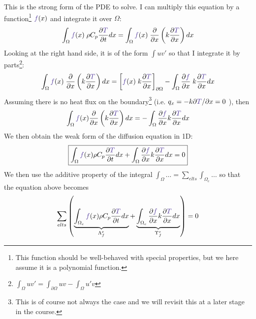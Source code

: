 This is the {\color{olive}strong form} of the PDE to solve. 
I can multiply this equation by a function\footnote{This function should be well-behaved with 
special properties, but we here assume it is a polynomial function.} ${\color{Violet}f}(x)$ 
and integrate it over $\Omega$:
\begin{equation}
\int_{\Omega} {\color{Violet}f}(x) \;  \rho C_p\frac{\partial {\color{Violet}T}}{\partial t} dx
=
\int_{\Omega} {\color{Violet}f}(x) \;  \frac{\partial }{\partial x} \left( k \frac{\partial {\color{Violet}T}}{\partial x}  \right) dx
\end{equation}
Looking at the right hand side, it is of the form $\int u v'$ so that I 
integrate it by parts\footnote{$\int_\Omega uv' = \int_{\partial\Omega} uv - \int_\Omega u'v$}:
\begin{equation}
\int_{\Omega} {\color{Violet}f}(x) \;  \frac{\partial }{\partial x} 
\left( k \frac{\partial {\color{Violet}T}}{\partial x}  \right) dx
=
\left[
 {\color{Violet}f}(x) \;  k \frac{\partial {\color{Violet}T}}{\partial x}
\right]_{\partial \Omega}
-
\int_{\Omega} \frac{\partial {\color{Violet}f}}{\partial x} \;   k \frac{\partial {\color{Violet}T}}{\partial x}  dx
\end{equation}
Assuming there is no heat flux on the boundary\footnote{This is of course not always the case
and we will revisit this at a later stage in the course.} (i.e. $q_x= - k \partial {\color{Violet}T}/\partial x = 0$ ), then
\begin{equation}
\int_{\Omega} {\color{Violet}f}(x) \frac{\partial }{\partial x} \left( k \frac{\partial {\color{Violet}T}}{\partial x}  
\right) dx
=
- \int_{\Omega} \frac{\partial {\color{Violet}f}}{\partial x}  k \frac{\partial {\color{Violet}T}}{\partial x}  dx
\end{equation}
We then obtain the {\color{olive}weak form} of the diffusion equation in 1D:
\begin{equation}
\boxed{
\int_{\Omega} {\color{Violet}f}(x) \rho C_p \frac{\partial {\color{Violet}T}}{\partial t} dx
+
\int_{\Omega} \frac{\partial {\color{Violet}f}}{\partial x}  k \frac{\partial {\color{Violet}T}}{\partial x}  dx = 0
}
\end{equation}
We then use the additive property of the integral 
$\int_\Omega \dots = \sum\limits_{elts} \int_{\Omega_e} \dots$
so that the equation above becomes 
\begin{equation}
\sum_{elts} \left(     
\underbrace{ \int_{\Omega_e} {\color{Violet}f}(x) \rho C_p   \frac{\partial {\color{Violet}T}}{\partial t} dx }_{{\Lambda}_f^e}
+
\underbrace{\int_{\Omega_e} \frac{\partial {\color{Violet}f}}{\partial x}  k \frac{\partial {\color{Violet}T}}{\partial x}  dx}_{{\Upsilon}_f^e}      \right) = 0  
\end{equation}


